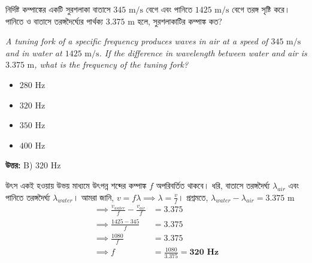 \documentclass[12pt, a4paper]{article}
\begin{document}
\newpage
\begin{tcolorbox}[questionbox={প্রশ্ন (Question) 1}]
    \noindent
    নির্দিষ্ট কম্পাঙ্কের একটি সুরশলাকা বাতাসে $345\text{ m/s}$ বেগে এবং পানিতে $1425\text{ m/s}$ বেগে তরঙ্গ সৃষ্টি করে। পানিতে ও বাতাসে তরঙ্গদৈর্ঘ্যের পার্থক্য $3.375\text{ m}$ হলে, সুরশলাকাটির কম্পাঙ্ক কত?
    
    \vspace{0.8em}
    \begin{english}
    \noindent\textit{\color{darkgray}
    A tuning fork of a specific frequency produces waves in air at a speed of $345\text{ m/s}$ and in water at $1425\text{ m/s}$. If the difference in wavelength between water and air is $3.375\text{ m}$, what is the frequency of the tuning fork?
    }
    \end{english}
\end{tcolorbox}

\begin{itemize}[label={}, leftmargin=1cm, itemsep=0.5em]
    \item[\textbf{A)}] $280\text{ Hz}$
    \item[\textbf{B)}] $320\text{ Hz}$
    \item[\textbf{C)}] $350\text{ Hz}$
    \item[\textbf{D)}] $400\text{ Hz}$
\end{itemize}

\vspace{0.5em}
\begin{tcolorbox}[answerbox]
    \textbf{\color{success} উত্তর:} B) $320\text{ Hz}$
\end{tcolorbox}
\vspace{1em}

\begin{tcolorbox}[solutionbox={সমাধান (Solution)}]
    \noindent
    উৎস একই হওয়ায় উভয় মাধ্যমে উৎপন্ন শব্দের কম্পাঙ্ক $f$ অপরিবর্তিত থাকবে। ধরি, বাতাসে তরঙ্গদৈর্ঘ্য $\lambda_{air}$ এবং পানিতে তরঙ্গদৈর্ঘ্য $\lambda_{water}$। আমরা জানি, $v = f \lambda \implies \lambda = \frac{v}{f}$। প্রশ্নমতে, $\lambda_{water} - \lambda_{air} = 3.375\text{ m}$
    \begin{align*}
        \implies \frac{v_{water}}{f} - \frac{v_{air}}{f} &= 3.375 \\
        \implies \frac{1425 - 345}{f} &= 3.375 \\
        \implies \frac{1080}{f} &= 3.375 \\
        \implies f &= \frac{1080}{3.375} = \mathbf{320\text{ Hz}}
    \end{align*}
\end{tcolorbox}
\end{document}

